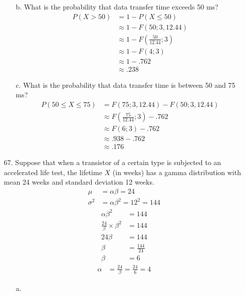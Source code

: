 \documentclass[letterpaper,12pt]{article}
\begin{document}
\begin{enumerate}
\begin{enumerate}
      \item[b.]
        What is the probability that data transfer time exceeds 50 ms?
        \begin{align*}
          P(X > 50) &= 1 - P(X \le 50) \\
          &\approx 1 - F(50; 3, 12.44) \\
          &\approx 1 - F\left(\frac{50}{12.44}; 3\right) \\
          &\approx 1 - F(4; 3) \\
          &\approx 1 - .762 \\
          &\approx .238
        \end{align*}
      \item[c.]
        What is the probability that data transfer time is between 50 and 75 ms?
        \begin{align*}
          P(50 \le X \le 75) &= F(75; 3, 12.44) - F(50; 3, 12.44) \\
          &\approx F\left(\frac{75}{12.44}; 3\right) - .762 \\
          &\approx F(6; 3) - .762 \\
          &\approx .938 - .762 \\
          &\approx .176
        \end{align*}
    \end{enumerate}
  \item[67.]
    Suppose that when a transistor of a certain type is subjected to an accelerated life test, the lifetime $X$ (in weeks) has a gamma distribution with mean 24 weeks and standard deviation 12 weeks.
    \begin{align*}
          \mu &= \alpha\beta = 24 \\
          \sigma^2 &= \alpha\beta^2 = 12^2 = 144
        \end{align*}
        \begin{align*}
          \alpha\beta^2 &= 144 \\
          \frac{24}{\beta} \times \beta^2 &= 144 \\
          24\beta &= 144 \\
          \beta &= \frac{144}{24} \\
          \beta &= 6
        \end{align*}
        \begin{align*}
          \alpha &= \frac{24}{\beta} = \frac{24}{6} = 4
        \end{align*}
    \begin{enumerate}
      \item[a.]

\end{enumerate}
\end{enumerate}
\end{document}
